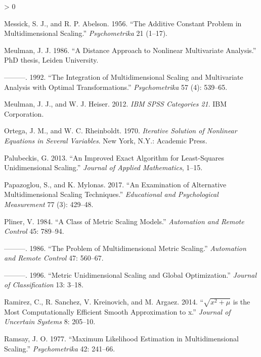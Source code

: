 \documentclass[
  12pt,
]{book}
\newlength{\cslhangindent}
\newenvironment{CSLReferences}[2] %
 {%
  \setlength{\parindent}{0pt}
  \ifodd #1 \everypar{\setlength{\hangindent}{\cslhangindent}}\ignorespaces\fi
  \ifnum #2 > 0
  \setlength{\parskip}{#2\baselineskip}
  \fi
 }%
 {}
\theoremstyle{definition}
\theoremstyle{definition}
\theoremstyle{definition}
\theoremstyle{definition}
\theoremstyle{remark}
\begin{document}
\begin{CSLReferences}{1}{0}
\leavevmode\hypertarget{ref-messick_abelson_56}{}%
Messick, S. J., and R. P. Abelson. 1956. {``{The Additive Constant Problem in Multidimensional Scaling}.''} \emph{Psychometrika} 21 (1--17).

\leavevmode\hypertarget{ref-meulman_86}{}%
Meulman, J. J. 1986. {``{A Distance Approach to Nonlinear Multivariate Analysis}.''} PhD thesis, Leiden University.

\leavevmode\hypertarget{ref-meulman_92}{}%
---------. 1992. {``{The Integration of Multidimensional Scaling and Multivariate Analysis with Optimal Transformations}.''} \emph{Psychometrika} 57 (4): 539--65.

\leavevmode\hypertarget{ref-meulman_heiser_12}{}%
Meulman, J. J., and W. J. Heiser. 2012. \emph{IBM SPSS Categories 21}. IBM Corporation.

\leavevmode\hypertarget{ref-ortega_rheinboldt_70}{}%
Ortega, J. M., and W. C. Rheinboldt. 1970. \emph{{Iterative Solution of Nonlinear Equations in Several Variables}}. New York, N.Y.: Academic Press.

\leavevmode\hypertarget{ref-palubeckis_13}{}%
Palubeckis, G. 2013. {``{An Improved Exact Algorithm for Least-Squares Unidimensional Scaling}.''} \emph{Journal of Applied Mathematics}, 1--15.

\leavevmode\hypertarget{ref-papazoglou_mylonas_17}{}%
Papazoglou, S., and K. Mylonas. 2017. {``{An Examination of Alternative Multidimensional Scaling Techniques}.''} \emph{Educational and Psychological Measurement} 77 (3): 429--48.

\leavevmode\hypertarget{ref-pliner_84}{}%
Pliner, V. 1984. {``{A Class of Metric Scaling Models}.''} \emph{Automation and Remote Control} 45: 789--94.

\leavevmode\hypertarget{ref-pliner_86}{}%
---------. 1986. {``{The Problem of Multidimensional Metric Scaling}.''} \emph{Automation and Remote Control} 47: 560--67.

\leavevmode\hypertarget{ref-pliner_96}{}%
---------. 1996. {``{Metric Unidimensional Scaling and Global Optimization}.''} \emph{Journal of Classification} 13: 3--18.

\leavevmode\hypertarget{ref-ramirez_sanchez_kreinovich_argaez_14}{}%
Ramirez, C., R. Sanchez, V. Kreinovich, and M. Argaez. 2014. {``{\(\sqrt{x^2+\mu}\) is the Most Computationally Efficient Smooth Approximation to \textbar x\textbar{}}.''} \emph{Journal of Uncertain Systems} 8: 205--10.

\leavevmode\hypertarget{ref-ramsay_77}{}%
Ramsay, J. O. 1977. {``{Maximum Likelihood Estimation in Multidimensional Scaling}.''} \emph{Psychometrika} 42: 241--66.


\end{CSLReferences}
\end{document}
